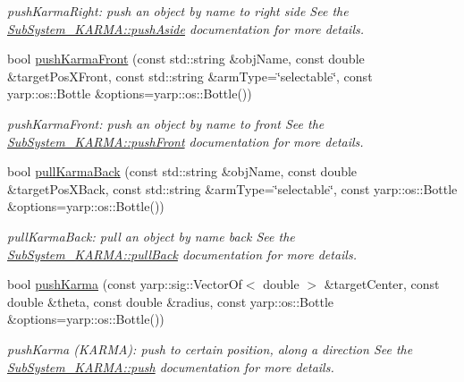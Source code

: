 \begin{DoxyCompactItemize}
\begin{DoxyCompactList}\small\item\em push\+Karma\+Right\+: push an object by name to right side See the \hyperlink{group__icubclient__subsystems_ae831bfd7af1572a65f53b11b9519e473}{Sub\+System\+\_\+\+K\+A\+R\+M\+A\+::push\+Aside} documentation for more details. \end{DoxyCompactList}\item 
bool \hyperlink{group__icubclient__clients_adb9b0ec66870a1dea115def6af252048}{push\+Karma\+Front} (const std\+::string \&obj\+Name, const double \&target\+Pos\+X\+Front, const std\+::string \&arm\+Type=\char`\"{}selectable\char`\"{}, const yarp\+::os\+::\+Bottle \&options=yarp\+::os\+::\+Bottle())
\begin{DoxyCompactList}\small\item\em push\+Karma\+Front\+: push an object by name to front See the \hyperlink{group__icubclient__subsystems_ac7835e392d76249294d19c863f88e679}{Sub\+System\+\_\+\+K\+A\+R\+M\+A\+::push\+Front} documentation for more details. \end{DoxyCompactList}\item 
bool \hyperlink{group__icubclient__clients_a5deec64a5964aacb94268867e804ae1e}{pull\+Karma\+Back} (const std\+::string \&obj\+Name, const double \&target\+Pos\+X\+Back, const std\+::string \&arm\+Type=\char`\"{}selectable\char`\"{}, const yarp\+::os\+::\+Bottle \&options=yarp\+::os\+::\+Bottle())
\begin{DoxyCompactList}\small\item\em pull\+Karma\+Back\+: pull an object by name back See the \hyperlink{group__icubclient__subsystems_a956b5bad90e96ca0c2c8f33f306256ac}{Sub\+System\+\_\+\+K\+A\+R\+M\+A\+::pull\+Back} documentation for more details. \end{DoxyCompactList}\item 
bool \hyperlink{group__icubclient__clients_a2890c9f5f2f1d5ab4fc371d556a7238c}{push\+Karma} (const yarp\+::sig\+::\+Vector\+Of$<$ double $>$ \&target\+Center, const double \&theta, const double \&radius, const yarp\+::os\+::\+Bottle \&options=yarp\+::os\+::\+Bottle())
\begin{DoxyCompactList}\small\item\em push\+Karma (K\+A\+R\+MA)\+: push to certain position, along a direction See the \hyperlink{group__icubclient__subsystems_aabe8749ad0593a522e8377477d7d3d9b}{Sub\+System\+\_\+\+K\+A\+R\+M\+A\+::push} documentation for more details. \end{DoxyCompactList}\item 

\end{DoxyCompactItemize}

